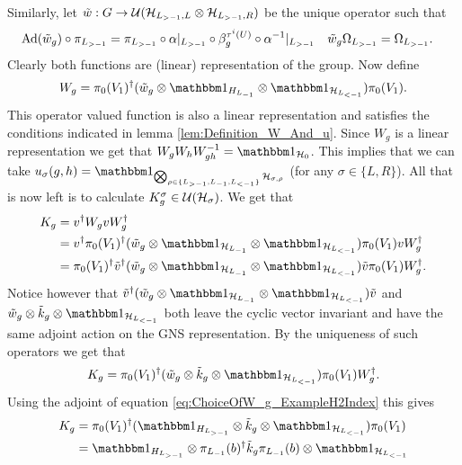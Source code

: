 \documentclass[11pt,a4paper,twoside]{article}
\numberwithin{equation}{section}
\begin{document}
Similarly, let $\tilde{w}:G\rightarrow\mathcal U(\mathcal H_{L_{>-1},L}\otimes\mathcal H_{L_{>-1},R})$ be the unique operator such that
\begin{align}
	\Ad{\tilde w_{g}}\circ\pi_{L_{>-1}}&=\pi_{L_{>-1}}\circ\alpha|_{L_{>-1}}\circ\beta_g^{\tau^{i}(U)}\circ \alpha^{-1}|_{L_{>-1}}&\tilde w_{g}\Omega_{L_{>-1}}&=\Omega_{L_{>-1}}.
\end{align}
Clearly both functions are (linear) representation of the group. Now define
\begin{equation}\label{eq:ChoiceOfW_g_ExampleH2Index}
	W_g=\pi_{0}(V_1)^{\dagger}(\tilde{w}_g\otimes\id_{H_{L_{-1}}}\otimes\id_{\HH_{L_{<-1}}}) \pi_{0}(V_1).
\end{equation}
This operator valued function is also a linear representation and satisfies the conditions indicated in lemma \ref{lem:Definition_W_And_u}. Since $W_g$ is a linear representation we get that $W_gW_hW_{gh}^{-1}=\id_{\HH_0}$. This implies that we can take $u_\sigma(g,h)=\id_{\bigotimes_{\rho\in\{L_{>-1},L_{-1},L_{<-1}\}}\HH_{\sigma,\rho}}$ (for any $\sigma\in\{L,R\}$). All that is now left is to calculate $K^\sigma_g\in\mathcal U(\mathcal H_\sigma)$. We get that
\begin{align}
	K_g&=v^\dagger W_g v W_g^\dagger\\
	&=v^\dagger \pi_{0}(V_1)^{\dagger}(\tilde{w}_g\otimes\id_{\HH_{L_{-1}}}\otimes\id_{\HH_{L_{<-1}}}) \pi_{0}(V_1) v W_g^\dagger\\
	&=\pi_{0}(V_1)^{\dagger}\tilde v^\dagger(\tilde{w}_g\otimes\id_{\HH_{L_{-1}}}\otimes\id_{\HH_{L_{<-1}}}) \tilde v \pi_{0}(V_1) W_g^\dagger.
\end{align}
Notice however that $\tilde v^\dagger(\tilde{w}_g\otimes\id_{\HH_{L_{-1}}}\otimes\id_{\HH_{L_{<-1}}}) \tilde v$ and $\tilde{w}_g\otimes\tilde{k}_g\otimes\id_{\HH_{L_{<-1}}}$ both leave the cyclic vector invariant and have the same adjoint action on the GNS representation. By the uniqueness of such operators we get that
\begin{equation}
	K_g=\pi_{0}(V_1)^{\dagger}(\tilde{w}_g\otimes\tilde{k}_g\otimes\id_{\HH_{L_{<-1}}}) \pi_{0}(V_1) W_g^\dagger.
\end{equation}
Using the adjoint of equation \eqref{eq:ChoiceOfW_g_ExampleH2Index} this gives
\begin{align}
	K_g&=\pi_{0}(V_1)^{\dagger}(\id_{H_{L_{>-1}}}\otimes \tilde k_g \otimes\id_{\HH_{L_{<-1}}}) \pi_{0}(V_1)\\
	&=\id_{H_{L_{>-1}}}\otimes \pi_{L_{-1}}(b)^\dagger \tilde k_g \pi_{L_{-1}}(b) \otimes\id_{\HH_{L_{<-1}}}
\end{align}
\end{document}
